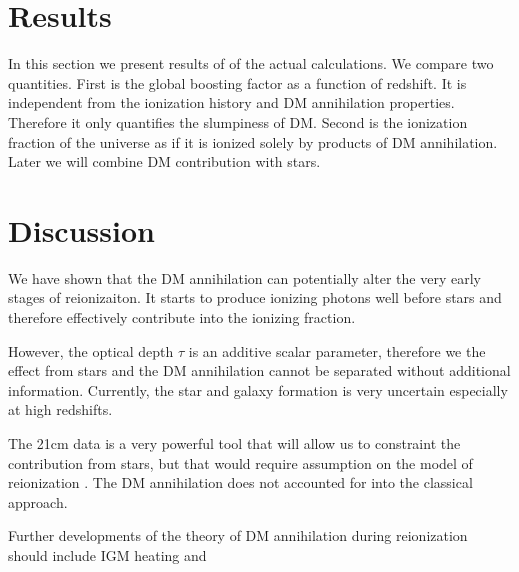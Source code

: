 \section{Results}
\label{sec:results}

In this section we present results of of the actual calculations. We compare two quantities. First is the global boosting factor as a function of redshift. It is independent from the ionization history and DM annihilation properties. Therefore it only quantifies the slumpiness of DM. Second is the ionization fraction of the universe as if it is ionized solely by products of DM annihilation. Later we will combine DM contribution with stars.

\section{Discussion}
\label{sec:discussion}

We have shown that the DM annihilation can potentially alter the very early stages of reionizaiton. It starts to produce ionizing photons well before stars and therefore effectively contribute into the ionizing fraction. 

However, the optical depth $\tau$ is an additive scalar parameter, therefore we the effect from stars and the DM annihilation cannot be separated without additional information. Currently, the star and galaxy formation is very uncertain especially at high redshifts.

The 21cm data is a very powerful tool that will allow us to constraint the contribution from stars, but that would require assumption on the model of reionization \cite{2015arXiv150908463L}. The DM annihilation does not accounted for into the classical approach.

Further developments of the theory of DM annihilation during reionization should include IGM heating and 